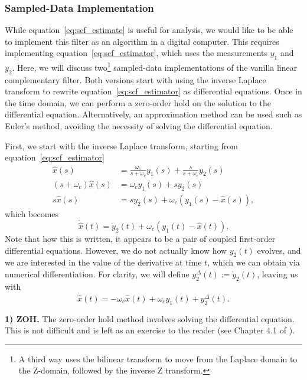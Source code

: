 \documentclass[a4paper]{article}
\begin{document}
\subsubsection*{Sampled-Data Implementation}
While equation~\eqref{eq:scf_estimate} is useful for analysis, we would like to be able to implement this filter as an algorithm in a digital computer.
This requires implementing equation~\eqref{eq:scf_estimator}, which uses the measurements $y_1$ and $y_2$.
Here, we will discuss two\footnote{A third way uses the bilinear transform to move from the Laplace domain to the Z-domain, followed by the inverse Z transform.} sampled-data implementations of the vanilla linear complementary filter.
Both versions start with using the inverse Laplace transform to rewrite equation~\eqref{eq:scf_estimator} as differential equations.
Once in the time domain, we can perform a zero-order hold on the solution to the differential equation.
Alternatively, an approximation method can be used such as Euler's method, avoiding the necessity of solving the differential equation.

First, we start with the inverse Laplace transform, starting from equation~\eqref{eq:scf_estimator}
\begin{align*}
            \hat{x}(s) &= \frac{\omega_c}{s+\omega_c}y_1(s) + \frac{s}{s+\omega_c}y_2(s) \\
(s+\omega_c)\hat{x}(s) &= \omega_c y_1(s) + s y_2(s) \\
           s\hat{x}(s) &= s y_2(s) + \omega_c \left(y_1(s) - \hat{x}(s)\right),
\end{align*}
which becomes
\begin{equation}\label{eq:scf_with_dot}
\dot{\hat x}(t) = \dot{y}_2(t) + \omega_c\left(y_1(t) - \hat{x}(t)\right).
\end{equation}
Note that how this is written, it appears to be a pair of coupled first-order differential equations.
However, we do not actually know how $y_2(t)$ evolves, and we are interested in the value of the derivative at time $t$, which we can obtain via numerical differentiation.
For clarity, we will define $y_2^\Delta(t):=\dot{y}_2(t)$, leaving us with
\begin{equation}
\dot{\hat x}(t) = -\omega_c\hat{x}(t) + \omega_cy_1(t) + y_2^\Delta(t).
\end{equation}

\textbf{1) ZOH.} The zero-order hold method involves solving the differential equation.
This is not difficult and is left as an exercise to the reader (see Chapter 4.1 of \citet{Beard2017}).
\end{document}

